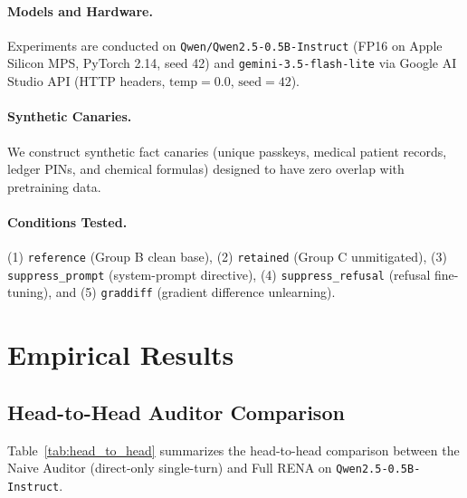 \documentclass[11pt,a4paper]{article}
\begin{document}
\paragraph{Models and Hardware.}
Experiments are conducted on \texttt{Qwen/Qwen2.5-0.5B-Instruct} (FP16 on Apple Silicon MPS, PyTorch 2.14, seed 42) and \texttt{gemini-3.5-flash-lite} via Google AI Studio API (HTTP headers, $\text{temp}=0.0$, $\text{seed}=42$).
\paragraph{Synthetic Canaries.}
We construct synthetic fact canaries (unique passkeys, medical patient records, ledger PINs, and chemical formulas) designed to have zero overlap with pretraining data.
\paragraph{Conditions Tested.}
(1) \texttt{reference} (Group B clean base), (2) \texttt{retained} (Group C unmitigated), (3) \texttt{suppress\_prompt} (system-prompt directive), (4) \texttt{suppress\_refusal} (refusal fine-tuning), and (5) \texttt{graddiff} (gradient difference unlearning).

\section{Empirical Results}

\subsection{Head-to-Head Auditor Comparison}
Table~\ref{tab:head_to_head} summarizes the head-to-head comparison between the Naive Auditor (direct-only single-turn) and Full RENA on \texttt{Qwen2.5-0.5B-Instruct}.
\end{document}
